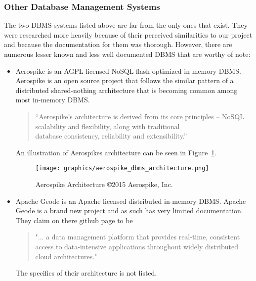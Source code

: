 \documentclass[letterpaper, 11pt]{article}
\begin{document}
\subsubsection{Other Database Management Systems}
The two DBMS systems listed above are far from the only ones that exist. They were
researched more heavily because of their perceived similarities to our project and
because the documentation for them was thorough. However, there are numerous lesser
known and less well documented DBMS that are worthy of note:

\begin{itemize}
  \item Aerospike is an AGPL licensed NoSQL flash-optimized in memory
  DBMS. Aerospike is an open source project that follows the similar pattern of
  a distributed shared-nothing architecture that is becoming common among most
  in-memory DBMS.
  \begin{quote}
  ``Aerospike's architecture is derived from its core principles –  NoSQL scalability and
  flexibility, along with traditional \\ database consistency, reliability and
  extensibility.'' \cite{aerospike}
  \end{quote}
  \par\vspace{\baselineskip}
  An illustration of Aerospikes architecture can be seen in Figure~\ref{fig:aerospike_architecture}.
  \begin{figure}[H]
    \centering
    \texttt{[image: graphics/aerospike\_dbms\_architecture.png]}
    \caption{Aerospike Architecture \copyright 2015 Aerospike, Inc. \cite{aerospike}}
    \label{fig:aerospike_architecture}
  \end{figure}
  \cite{aerospike}
  \par\vspace{\baselineskip}
  \item Apache Geode is an Apache licensed distributed in-memory DBMS. Apache Geode is
  a brand new project and as such has very limited documentation. They claim on there
  github page to be
  \begin{quote}
  "... a data management platform that provides real-time, consistent access to
  data-intensive applications throughout widely distributed cloud architectures."
  \cite{aerospike}
  \end{quote}
  The specifics of their architecture is not listed.
  \par\vspace{\baselineskip}

\end{itemize}
\end{document}
